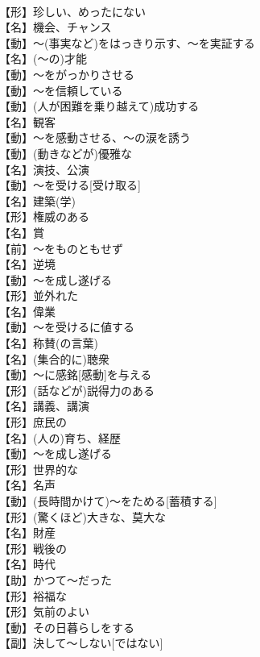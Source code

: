 \documentclass[8pt]{extreport}
\begin{document}
\begin{CJK}{UTF8}{min}
\\	【形】珍しい、めったにない
\\	【名】機会、チャンス
\\	【動】～(事実など)をはっきり示す、～を実証する
\\	【名】(～の)才能
\\	【動】～をがっかりさせる
\\	【動】～を信頼している
\\	【動】(人が困難を乗り越えて)成功する
\\	【名】観客
\\	【動】～を感動させる、～の涙を誘う
\\	【動】(動きなどが)優雅な
\\	【名】演技、公演
\\	【動】～を受ける[受け取る]
\\	【名】建築(学)
\\	【形】権威のある
\\	【名】賞
\\	【前】～をものともせず
\\	【名】逆境
\\	【動】～を成し遂げる
\\	【形】並外れた
\\	【名】偉業
\\	【動】～を受けるに値する
\\	【名】称賛(の言葉)
\\	【名】(集合的に)聴衆
\\	【動】～に感銘[感動]を与える
\\	【形】(話などが)説得力のある
\\	【名】講義、講演
\\	【形】庶民の
\\	【名】(人の)育ち、経歴
\\	【動】～を成し遂げる
\\	【形】世界的な
\\	【名】名声
\\	【動】(長時間かけて)～をためる[蓄積する]
\\	【形】(驚くほど)大きな、莫大な
\\	【名】財産
\\	【形】戦後の
\\	【名】時代
\\	【助】かつて～だった
\\	【形】裕福な
\\	【形】気前のよい
\\	【動】その日暮らしをする
\\	【副】決して～しない[ではない]

\end{CJK}
\end{document}
